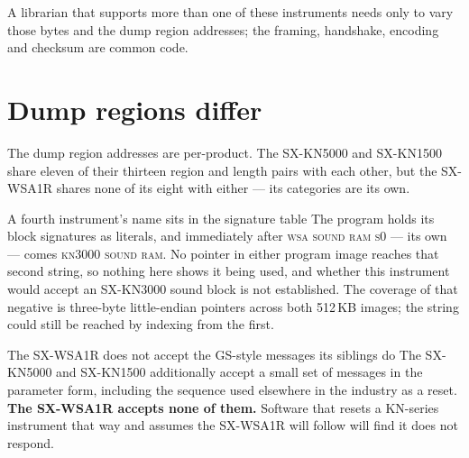 A librarian that supports more than one of these instruments needs only to vary those bytes
and the dump region addresses; the framing, handshake, encoding and checksum are common
code.

\section{Dump regions differ}
The dump region addresses are per-product. The SX-KN5000 and SX-KN1500 share eleven of
their thirteen region and length pairs with each other, but the SX-WSA1R shares none of
its eight with either --- its categories are its own.

\begin{note}{A fourth instrument's name sits in the signature table}
The program holds its block signatures as literals, and immediately after
\textsc{wsa sound ram s0} --- its own --- comes \textsc{kn3000 sound ram}. No pointer in
either program image reaches that second string, so nothing here shows it being used, and
whether this instrument would accept an SX-KN3000 sound block is not established. The
coverage of that negative is three-byte little-endian pointers across both 512\,KB
images; the string could still be reached by indexing from the first.
\end{note}

\begin{caution}{The SX-WSA1R does not accept the GS-style messages its siblings do}
The SX-KN5000 and SX-KN1500 additionally accept a small set of messages in the
 parameter form, including the sequence  used
elsewhere in the industry as a reset. \textbf{The SX-WSA1R accepts none of them.} Software
that resets a KN-series instrument that way and assumes the SX-WSA1R will follow will find
it does not respond.
\end{caution}

